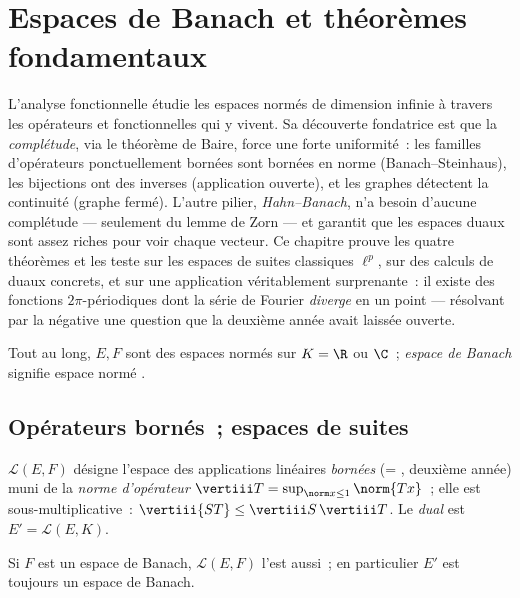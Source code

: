 \chapter{Espaces de Banach et théorèmes fondamentaux}
\label{ch:b3:banach}

L'analyse fonctionnelle étudie les espaces normés de dimension
infinie à travers les opérateurs et fonctionnelles qui y
vivent. Sa découverte fondatrice est que la \emph{complétude},
via le théorème de Baire, force une forte uniformité~: les
familles d'opérateurs ponctuellement bornées sont bornées en
norme (Banach--Steinhaus), les bijections  ont des
inverses  (application ouverte), et les graphes
détectent la continuité (graphe fermé). L'autre pilier,
\emph{Hahn--Banach}, n'a besoin d'aucune complétude ---
seulement du lemme de Zorn --- et garantit que les espaces
duaux sont assez riches pour voir chaque vecteur. Ce chapitre
prouve les quatre théorèmes et les teste sur les espaces de
suites classiques $\ell^p$, sur des calculs de duaux concrets,
et sur une application véritablement surprenante~: il existe
des fonctions  $2\pi$-périodiques dont la série de
Fourier \emph{diverge} en un point --- résolvant par la
négative une question que la deuxième année avait laissée
ouverte.

Tout au long, $E, F$ sont des espaces normés sur $K = \R$ ou
$\C$~; \emph{espace de Banach} signifie
espace normé .

\section{Opérateurs bornés~; espaces de suites}

\begin{definition}\label{def:b3:banach:operator}
$\mathcal L(E, F)$ désigne l'espace des applications linéaires
\emph{bornées} (= , deuxième année) muni de la
\emph{norme d'opérateur} $\vertiii T
= \sup_{\norm x \leq 1}\norm{Tx}$~; elle est
sous-multiplicative~: $\vertiii{ST} \leq \vertiii
S\,\vertiii T$. Le \emph{dual} est $E' =
\mathcal L(E, K)$.
\end{definition}

\begin{proposition}\label{prop:b3:banach:llcomplete}
Si $F$ est un espace de Banach, $\mathcal L(E, F)$ l'est aussi~;
en particulier $E'$ est toujours un espace de Banach.
\end{proposition}


